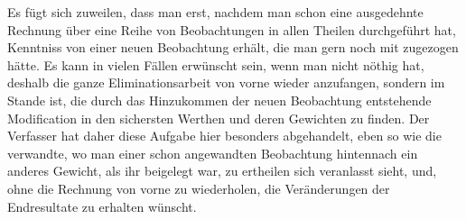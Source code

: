 \documentclass[12pt,a4paper]{article}
\begin{document}
Es f\"ugt sich zuweilen, dass man erst, nachdem man schon eine ausgedehnte Rechnung \"uber eine Reihe von Beobachtungen in allen Theilen durchgef\"uhrt hat, Kenntniss von einer neuen Beobachtung erh\"alt, die man gern noch mit zugezogen h\"atte. Es kann in vielen F\"allen erw\"unscht sein, wenn man nicht n\"othig hat, deshalb die ganze Eliminationsarbeit von vorne wieder anzufangen, sondern im Stande ist, die durch das Hinzukommen der neuen Beobachtung entstehende Modification in den sichersten Werthen und deren Gewichten zu finden. Der Verfasser hat daher diese Aufgabe hier besonders abgehandelt, eben so wie die verwandte, wo man einer schon angewandten Beobachtung hintennach ein anderes Gewicht, als ihr beigelegt war, zu ertheilen sich veranlasst sieht, und, ohne die Rechnung von vorne zu wiederholen, die Ver\"anderungen der Endresultate zu erhalten w\"unscht.
\end{document}
